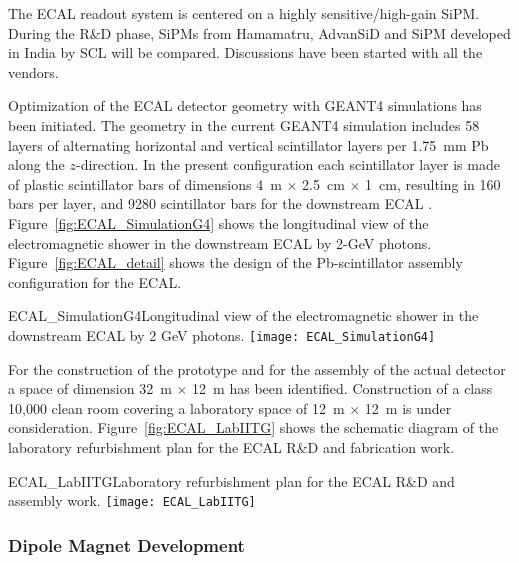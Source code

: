 The ECAL readout system is centered on a highly sensitive/high-gain
SiPM.  During the R\&D phase, SiPMs from Hamamatru, AdvanSiD and SiPM
developed in India by SCL will be compared.  Discussions have been
started with all the vendors.

Optimization of the ECAL detector geometry with GEANT4 simulations has
been initiated. The geometry in the current GEANT4 simulation includes
58 layers of alternating horizontal and vertical scintillator layers
per 1.75~mm Pb along the $z$-direction. In the present configuration
each scintillator layer is made of plastic scintillator bars of
dimensions 4~m $\times$ 2.5~cm $\times$ 1~cm, resulting in 160 bars per
layer, and \num{9280} scintillator bars for the downstream ECAL .
Figure~\ref{fig:ECAL_SimulationG4} shows the longitudinal view of the
electromagnetic shower in the downstream ECAL by 2-GeV
photons. Figure~\ref{fig:ECAL_detail} shows the design of the
Pb-scintillator assembly configuration for the ECAL.
\begin{cdrfigure}
{ECAL_SimulationG4}{Longitudinal view of the electromagnetic shower in
the downstream ECAL by 2 GeV photons.}
\texttt{[image: ECAL\_SimulationG4]}
\end{cdrfigure}

For the construction of the prototype and for the assembly of the
actual detector a space of dimension 32~m $\times$ 12~m has been
identified. Construction of a class 10,000 clean room covering a
laboratory space of 12~m $\times$ 12~m is under consideration.
Figure~\ref{fig:ECAL_LabIITG} shows the schematic diagram of the
laboratory refurbishment plan for the ECAL R\&D and fabrication work.
\begin{cdrfigure}
{ECAL_LabIITG}{Laboratory refurbishment plan for the ECAL R\&D and assembly work.}
\texttt{[image: ECAL\_LabIITG]}
\end{cdrfigure}


\subsubsection{Dipole Magnet Development}


